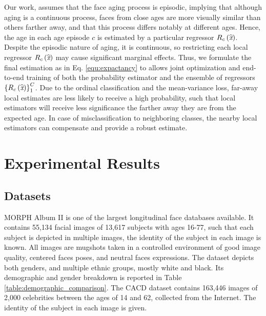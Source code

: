 \documentclass[10pt,journal]{IEEEtran}\usepackage{amsfonts}
\begin{document}
Our work, assumes that the face aging process is episodic, implying that
although aging is a continuous process, faces from close ages are more
visually similar than others farther away, and that this process differs
notably at different ages. Hence, the age in each age episode $c$ is estimated
by a particular regressor $R_{c}\left(  \widehat{\emph{x}}\right)  $. Despite
the episodic nature of aging, it is continuous, so restricting each local
regressor $R_{c}\left(  \widehat{\emph{x}}\right)  $ may cause significant
marginal effects. Thus, we formulate the final estimation as in Eq.
\ref{equ:expactancy} to allows joint optimization and end-to-end training of
both the probability estimator and the ensemble of regressors $\left\{
R_{c}\left(  \widehat{\emph{x}}\right)  \right\}  _{1}^{C}$. Due to the
ordinal classification and the mean-variance loss, far-away local estimates
are less likely to receive a high probability, such that local estimators will
receive less significance the farther away they are from the expected age. In
case of misclassification to neighboring classes, the nearby local estimators
can compensate and provide a robust estimate.

\section{Experimental Results}

\label{sec:Experiments}

\subsection{Datasets}

\label{subsec:dataset}

MORPH Album II \cite{1613043} is one of the largest longitudinal face
databases available. It contains 55,134 facial images of 13,617 subjects with
ages 16-77, such that each subject is depicted in multiple images, the
identity of the subject in each image is known. All images are mugshots taken
in a controlled environment of good image quality, centered faces poses, and
neutral faces expressions. The dataset depicts both genders, and multiple
ethnic groups, mostly white and black. Its demographic and gender breakdown is
reported in Table \ref{table:demographic_comparison}. The CACD dataset
\cite{chen14cross} contains 163,446 images of 2,000 celebrities between the
ages of 14 and 62, collected from the Internet. The identity of the subject in
each image is given.
\end{document}
